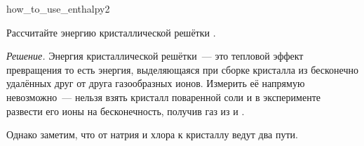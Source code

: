\begin{example}{}{how_to_use_enthalpy2}
    \begin{condition}
        Рассчитайте энергию кристаллической решётки .
    \end{condition}

    \medskip

    \textit{Решение.} Энергия кристаллической решётки~--- это тепловой эффект превращения
    то есть энергия, выделяющаяся при сборке кристалла из бесконечно удалённых друг от друга газообразных ионов. Измерить её напрямую невозможно~--- нельзя взять кристалл поваренной соли и в эксперименте развести его ионы на бесконечность, получив газ из  и .

    Однако заметим, что от натрия и хлора к кристаллу  ведут два пути.


\end{example}
